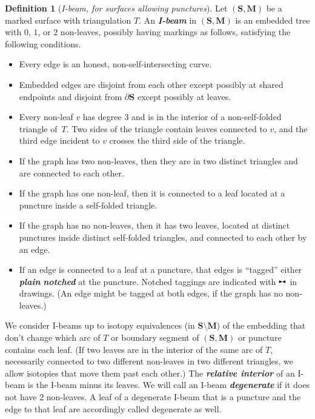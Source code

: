 \documentclass{amsart}
\theoremstyle{definition}
\newtheorem{definition}[proposition]{Definition}
\theoremstyle{remark}
\numberwithin{equation}{section}
\newcommand{\newword}[1]{\textbf{\emph{#1}}}
\newcommand{\0}{{\mathbf{0}}}
\newcommand{\M}{\mathbf{M}}
\renewcommand{\S}{\mathbf{S}}
\newcommand{\notch}{^{\scalebox{0.6}{\raisebox{-3pt}{$\mathrel \blacktriangleright \joinrel \mathrel \blacktriangleleft$}}}}
\begin{document}
\begin{definition}[\emph{I-beam, for surfaces allowing punctures}]\label{def: i-beam}
Let $(\S,\M)$ be a marked surface with triangulation $T$.  
An \newword{I-beam} in $(\S,\M)$ is an embedded tree with $0$, $1$, or $2$ non-leaves, possibly having markings as follows, satisfying the following conditions.
\begin{itemize}
\item Every edge is an honest, non-self-intersecting curve.
\item Embedded edges are disjoint from each other except possibly at shared endpoints and disjoint from $\partial\S$ except possibly at leaves.
\item Every non-leaf $v$ has degree $3$ and is in the interior of a non-self-folded triangle of~$T$.
Two sides of the triangle contain leaves connected to $v$, and the third edge incident to $v$ crosses the third side of the triangle.
\item If the graph has two non-leaves, then they are in two distinct triangles and are connected to each other.
\item If the graph has one non-leaf, then it is connected to a leaf located at a puncture inside a self-folded triangle. 
\item If the graph has no non-leaves, then it has two leaves, located at distinct punctures inside distinct self-folded triangles, and connected to each other by an edge.
\item 
If an edge is connected to a leaf at a puncture, that edges is ``tagged'' either \newword{plain} \newword{notched} at the puncture.  
Notched taggings are indicated with $\notch$ in drawings.
(An edge might be tagged at both edges, if the graph has no non-leaves.)
\end{itemize}
We consider I-beams up to isotopy equivalences (in $\S\setminus\M$) of the embedding that don't change which arc of $T$ or boundary segment of $(\S,\M)$ or puncture contains each leaf.
(If two leaves are in the interior of the same arc of $T$, necessarily connected to two different non-leaves in two different triangles, we allow isotopies that move them past each other.)  The \newword{relative interior} of an I-beam is the I-beam minus its leaves.
We will call an I-beam \newword{degenerate} if it does not have $2$ non-leaves.
A leaf of a degenerate I-beam that is a puncture and the edge to that leaf are accordingly called degenerate as well.
\end{definition}
\end{document}
